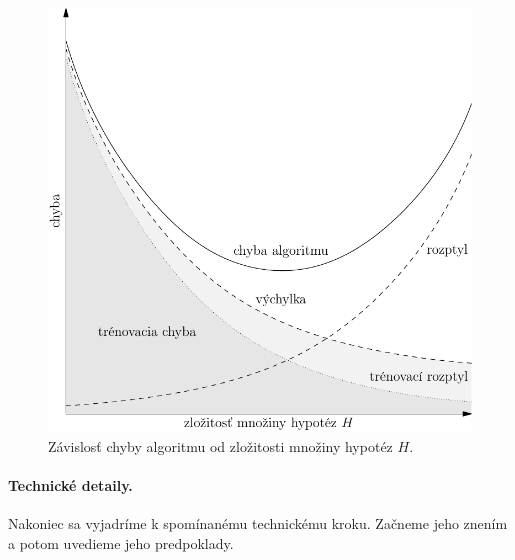 \begin{figure}
  \centering
  \includegraphics[scale=0.8]{obrazky/krivky2.pdf}
  \caption{Závislosť chyby algoritmu od zložitosti množiny hypotéz $H$.}
  \label{img:hypo}
\end{figure}


\paragraph{Technické detaily.}
Nakoniec sa vyjadríme k spomínanému technickému kroku. Začneme jeho
znením a potom uvedieme jeho predpoklady.

